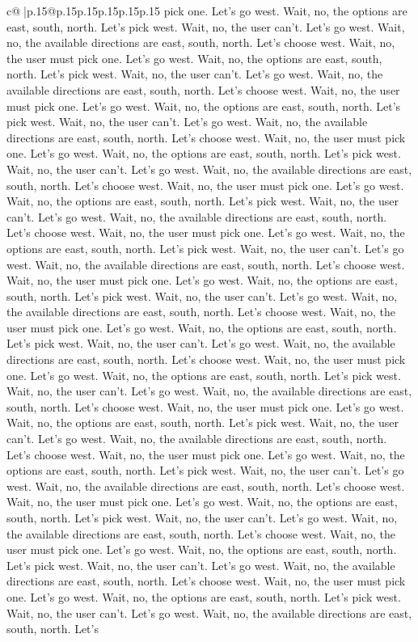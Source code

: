 \documentclass{article}
\begin{document}
{\begin{supertabular}{c@{$\;$}|p{.15\linewidth}@{}p{.15\linewidth}p{.15\linewidth}p{.15\linewidth}p{.15\linewidth}p{.15\linewidth}}
{{{pick one. Let's go west. Wait, no, the options are east, south, north. Let's pick west. Wait, no, the user can't. Let's go west. Wait, no, the available directions are east, south, north. Let's choose west. Wait, no, the user must pick one. Let's go west. Wait, no, the options are east, south, north. Let's pick west. Wait, no, the user can't. Let's go west. Wait, no, the available directions are east, south, north. Let's choose west. Wait, no, the user must pick one. Let's go west. Wait, no, the options are east, south, north. Let's pick west. Wait, no, the user can't. Let's go west. Wait, no, the available directions are east, south, north. Let's choose west. Wait, no, the user must pick one. Let's go west. Wait, no, the options are east, south, north. Let's pick west. Wait, no, the user can't. Let's go west. Wait, no, the available directions are east, south, north. Let's choose west. Wait, no, the user must pick one. Let's go west. Wait, no, the options are east, south, north. Let's pick west. Wait, no, the user can't. Let's go west. Wait, no, the available directions are east, south, north. Let's choose west. Wait, no, the user must pick one. Let's go west. Wait, no, the options are east, south, north. Let's pick west. Wait, no, the user can't. Let's go west. Wait, no, the available directions are east, south, north. Let's choose west. Wait, no, the user must pick one. Let's go west. Wait, no, the options are east, south, north. Let's pick west. Wait, no, the user can't. Let's go west. Wait, no, the available directions are east, south, north. Let's choose west. Wait, no, the user must pick one. Let's go west. Wait, no, the options are east, south, north. Let's pick west. Wait, no, the user can't. Let's go west. Wait, no, the available directions are east, south, north. Let's choose west. Wait, no, the user must pick one. Let's go west. Wait, no, the options are east, south, north. Let's pick west. Wait, no, the user can't. Let's go west. Wait, no, the available directions are east, south, north. Let's choose west. Wait, no, the user must pick one. Let's go west. Wait, no, the options are east, south, north. Let's pick west. Wait, no, the user can't. Let's go west. Wait, no, the available directions are east, south, north. Let's choose west. Wait, no, the user must pick one. Let's go west. Wait, no, the options are east, south, north. Let's pick west. Wait, no, the user can't. Let's go west. Wait, no, the available directions are east, south, north. Let's choose west. Wait, no, the user must pick one. Let's go west. Wait, no, the options are east, south, north. Let's pick west. Wait, no, the user can't. Let's go west. Wait, no, the available directions are east, south, north. Let's choose west. Wait, no, the user must pick one. Let's go west. Wait, no, the options are east, south, north. Let's pick west. Wait, no, the user can't. Let's go west. Wait, no, the available directions are east, south, north. Let's choose west. Wait, no, the user must pick one. Let's go west. Wait, no, the options are east, south, north. Let's pick west. Wait, no, the user can't. Let's go west. Wait, no, the available directions are east, south, north. Let's }}}
\end{supertabular}}
\end{document}
